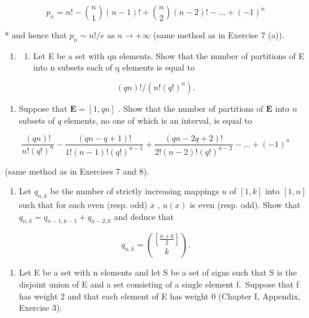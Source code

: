 \[
p _ {n} = n! - \binom {n} {1} (n - 1)! + \binom {n} {2} (n - 2)! - \dots + (- 1) ^ {n}
\]

* and hence that \(p_n \sim n! / e\) as \(n \to +\infty\) (same method as in Exercise 7 (a)).

\begin{enumerate}
\def\labelenumi{\arabic{enumi}.}
\setcounter{enumi}{8}
\tightlist
\item
  \begin{enumerate}
  \def\labelenumii{(\alph{enumii})}
  \tightlist
  \item
    Let E be a set with qn elements. Show that the number of partitions of E into n subsets each of q elements is equal to
  \end{enumerate}
\end{enumerate}

\[
(q n)! / (n! (q!) ^ {n}).
\]

\begin{enumerate}
\def\labelenumi{(\alph{enumi})}
\setcounter{enumi}{1}
\tightlist
\item
  Suppose that \(\mathbf{E} = [1, qn]\) . Show that the number of partitions of \(\mathbf{E}\) into \(n\) subsets of \(q\) elements, no one of which is an interval, is equal to
\end{enumerate}

\[
\frac {(q n) !}{n ! (q !) ^ {n}} - \frac {(q n - q + 1) !}{1 ! (n - 1) ! (q !) ^ {n - 1}} + \frac {(q n - 2 q + 2) !}{2 ! (n - 2) ! (q !) ^ {n - 2}} - \dots + (- 1) ^ {n}
\]

(same method as in Exercises 7 and 8).

\begin{enumerate}
\def\labelenumi{\arabic{enumi}.}
\setcounter{enumi}{9}
\tightlist
\item
  Let \(q_{n,k}\) be the number of strictly increasing mappings \(u\) of \([1, k]\) into \([1, n]\) such that for each even (resp. odd) \(x\) , \(u(x)\) is even (resp. odd). Show that \(q_{n,k} = q_{n-1, k-1} + q_{n-2, k}\) and deduce that
\end{enumerate}

\[
q _ {n, k} = \binom {\left[ \frac {n + k}{2} \right]} {k}.
\]

\begin{enumerate}
\def\labelenumi{\arabic{enumi}.}
\setcounter{enumi}{10}
\tightlist
\item
  Let E be a set with n elements and let S be a set of signs such that S is the disjoint union of E and a set consisting of a single element f.~Suppose that f has weight 2 and that each element of E has weight 0 (Chapter I, Appendix, Exercise 3).
\end{enumerate}

